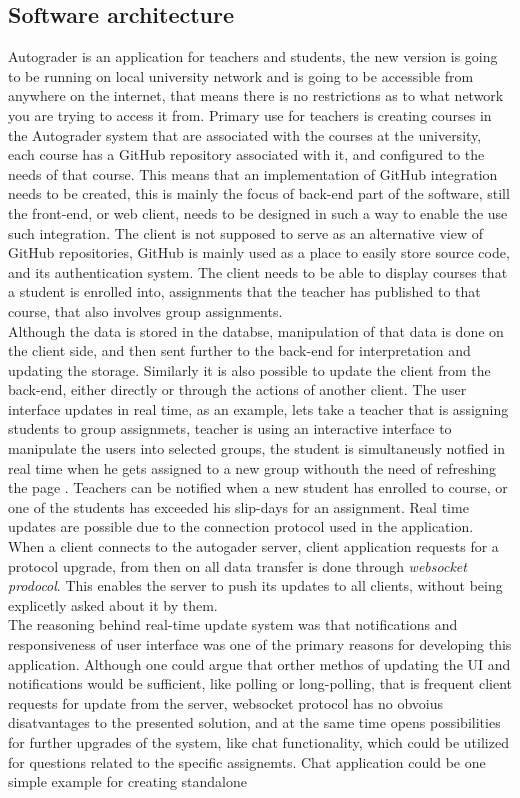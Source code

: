 \subsection{Software architecture}
Autograder is an application for teachers and students, the new version is going to be running on local university network and is going to be accessible from anywhere on the internet, that means there is no restrictions as to what network you are trying to access it from. Primary use for teachers is creating courses in the Autograder system that are associated with the courses at the university, each course has a GitHub repository associated with it, and configured to the needs of that course. This means that an implementation of GitHub integration needs to be created, this is mainly the focus of back-end part of the software, still the front-end, or web client, needs to be designed in such a way to enable the use such integration. The client is not supposed to serve as an alternative view of GitHub repositories, GitHub is mainly used as a place to easily store source code, and its authentication system. The client needs to be able to display courses that a student is enrolled into, assignments that the teacher has published to that course, that also involves group assignments.
\\Although the data is stored in the databse, manipulation of that data is done on the client side, and then sent further to the back-end for interpretation and updating the storage. Similarly it is also possible to update the client from the back-end, either directly or through the actions of another client. The user interface updates in real time, as an example, lets take a teacher that is assigning students to group assignmets, teacher is using an interactive interface to manipulate the users into selected groups, the student is simultaneusly notfied in real time when he gets assigned to a new group withouth the need of refreshing the page . Teachers can be notified when a new student has enrolled to course, or one of the students has exceeded his slip-days for an assignment. Real time updates are possible due to the connection protocol used in the application. When a client connects to the autogader server, client application requests for a protocol upgrade, from then on all data transfer is done through \emph{websocket prodocol}\cite{websocket}. This enables the server to push its updates to all clients, without being explicetly asked about it by them.
\\The reasoning behind real-time update system was that notifications and responsiveness of user interface was one of the primary reasons for developing this application. Although one could argue that orther methos of updating the UI and notifications would be sufficient, like polling or long-polling, that is frequent client requests for update from the server, websocket protocol has no obvoius disatvantages to the presented solution, and at the same time opens possibilities for further upgrades of the system, like chat functionality, which could be utilized for questions related to the specific assignemts. Chat application could be one simple example for creating standalone 

